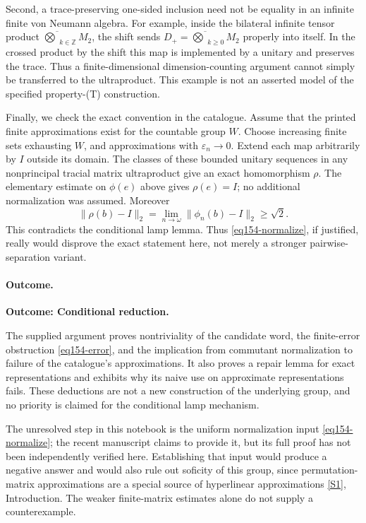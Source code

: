 \documentclass[11pt,a4paper]{article}
\newcommand{\Z}{\mathbb{Z}}
\newcommand{\eps}{\varepsilon}
\newcommand{\sref}[2]{\hyperlink{source:#1:#2}{[S#2]}}
\numberwithin{equation}{section}
\begin{document}
Second, a trace-preserving one-sided inclusion need not be equality in an
infinite finite von Neumann algebra. For example, inside the bilateral
infinite tensor product $\overline\bigotimes_{k\in\Z}M_2$, the shift sends
$D_+=\overline\bigotimes_{k\ge0}M_2$ properly into itself. In the crossed
product by the shift this map is implemented by a unitary and preserves the
trace. Thus a finite-dimensional dimension-counting argument cannot simply
be transferred to the ultraproduct. This example is not an asserted model
of the specified property-(T) construction.

Finally, we check the exact convention in the catalogue. Assume that the
printed finite approximations exist for the countable group $W$. Choose
increasing finite sets exhausting $W$, and approximations with
$\eps_n\to0$. Extend each map arbitrarily by $I$ outside its domain. The
classes of these bounded unitary sequences in any nonprincipal tracial
matrix ultraproduct give an exact homomorphism $\rho$. The elementary
estimate on $\phi(e)$ above gives $\rho(e)=I$; no additional normalization
was assumed. Moreover
\[
 \|\rho(b)-I\|_2=\lim_{n\to\omega}\|\phi_n(b)-I\|_2\ge\sqrt2.
\]
This contradicts the conditional lamp lemma. Thus
\eqref{eq154-normalize}, if justified, really would disprove the exact
statement here, not merely a stronger pairwise-separation variant.

\paragraph{Outcome.}
\textbf{Outcome: Conditional reduction.}

The supplied argument proves nontriviality of the candidate word, the
finite-error obstruction \eqref{eq154-error}, and the implication from
commutant normalization to failure of the catalogue's approximations. It
also proves a repair lemma for exact representations and exhibits why its
naive use on approximate representations fails. These deductions are not a
new construction of the underlying group, and no priority is claimed for
the conditional lamp mechanism.

The unresolved step in this notebook is the uniform normalization input
\eqref{eq154-normalize}; the recent manuscript claims to provide it, but
its full proof has not been independently verified here. Establishing that
input would produce a negative answer and would also rule out soficity of
this group, since permutation-matrix approximations are a special source
of hyperlinear approximations \sref{154}{1}, Introduction. The weaker
finite-matrix estimates alone do not supply a counterexample.
\end{document}
